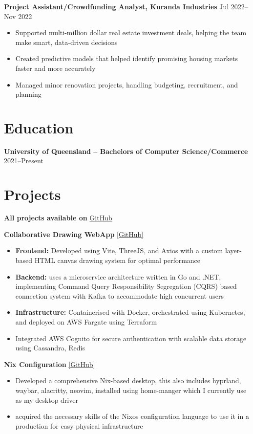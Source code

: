 \documentclass[10pt,a4paper]{article}
\begin{document}
	\textbf{Project Assistant/Crowdfunding Analyst, Kuranda Industries} \hfill Jul 2022--Nov 2022 
	\begin{itemize}[label=\textbullet, itemsep=0.05cm]
		\item Supported multi-million dollar real estate investment deals, helping the team make smart, data-driven decisions
		\item Created predictive models that helped identify promising housing markets faster and more accurately
		\item Managed minor renovation projects, handling budgeting, recruitment, and planning
	\end{itemize}
	
	\section{Education}
	\textbf{University of Queensland -- Bachelors of Computer Science/Commerce} \hfill 2021--Present \\	
	\section{Projects}
	\textbf{All projects available on} \href{https://github.com/CameronBadman}{GitHub}
	
	\textbf{Collaborative Drawing WebApp} \href{https://github.com/CameronBadman/Canvis-collab-webapp}{[GitHub]}
	\begin{itemize}[label=\textbullet, itemsep=0.05cm]
		\item \textbf{Frontend:} Developed using Vite, ThreeJS, and Axios with a custom layer-based HTML canvas drawing system for optimal performance
		\item \textbf{Backend:} uses a microservice architecture written in Go and .NET, implementing Command Query Responsibility Segregation (CQRS) based connection system with Kafka to accommodate high concurrent users
		\item \textbf{Infrastructure:} Containerised with Docker, orchestrated using Kubernetes, and deployed on AWS Fargate using Terraform
		\item Integrated AWS Cognito for secure authentication with scalable data storage using Cassandra, Redis
	\end{itemize}
	
	\textbf{Nix Configuration} \href{https://github.com/CameronBadman/nvim-config}{[GitHub]}
	\begin{itemize}[label=\textbullet, itemsep=0.05cm]
		\item Developed a comprehensive Nix-based desktop, this also includes hyprland, waybar, alacritty, neovim, installed using home-manger which I currently use as my desktop driver
		\item acquired the necessary skills of the Nixos configuration language to use it in a production for easy physical infrastructure
	\end{itemize}
	
\end{document}
